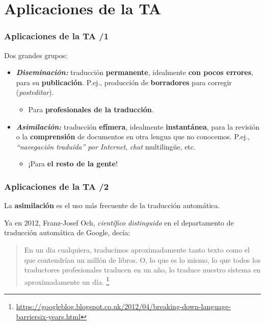 \documentclass{beamer}
\newcommand{\empha}[1]{\emph{#1}\/}
\begin{document}



\section{Aplicaciones de la TA}


\begin{frame}
\frametitle{Aplicaciones de la TA /1}
Dos grandes grupos:
\begin{itemize} 

\item\empha{\textbf{Diseminación:}} traducción \textbf{permanente}, idealmente
  \textbf{con pocos errores}, para su  \textbf{publicación}. P.ej.,
  producción de \textbf{borradores} para corregir
  (\textit{posteditar}).
\begin{itemize}
\item Para \textbf{profesionales de la traducción}.
\end{itemize}

\item\empha{\textbf{Asimilación:}} traducción \textbf{efímera}, idealmente
  \textbf{instantánea}, para la revisión o la \textbf{comprensión} de
  documentos en otra lengua que no conocemos. P.ej.,
  \empha{``navegación traduïda'' por Internet}, \textit{chat}
  multilingüe, etc.
  \begin{itemize}
  \item ¡Para \textbf{el resto de la gente}!

  \end{itemize}

\end{itemize}

\end{frame}

\begin{frame}
\frametitle{Aplicaciones de la TA /2}

La \textbf{asimilación} es el uso más frecuente de la traducción automática.

Ya en 2012, Franz-Josef Och, \emph{científico distinguido} en el departamento de traducción automática de Google, decía:
\begin{quote}
En un dia cualquiera, traducimos aproximadamente tanto texto como el que contendrían un millón de libros. O, lo que es lo mismo, lo que todos los traductores profesionales traducen en un año, lo traduce nuestro sistema en aproximadamente un día.  \footnote{\url{https://googleblog.blogspot.co.uk/2012/04/breaking-down-language-barriersix-years.html}}
\end{quote} 


\end{frame}
\end{document}
